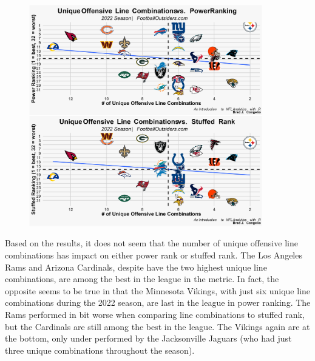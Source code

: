 \documentclass[
  letterpaper,
]{krantz}
\begin{document}
\begin{figure}

{\centering \includegraphics[width=4in,height=\textheight]{images/cow_plot_finished.png}

}

\end{figure}

Based on the results, it does not seem that the number of unique
offensive line combinations has impact on either power rank or stuffed
rank. The Los Angeles Rams and Arizona Cardinals, despite have the two
highest unique line combinations, are among the best in the league in
the metric. In fact, the opposite seems to be true in that the Minnesota
Vikings, with just six unique line combinations during the 2022 season,
are last in the league in power ranking. The Rams performed in bit worse
when comparing line combinations to stuffed rank, but the Cardinals are
still among the best in the league. The Vikings again are at the bottom,
only under performed by the Jacksonville Jaguars (who had just three
unique combinations throughout the season).
\end{document}
